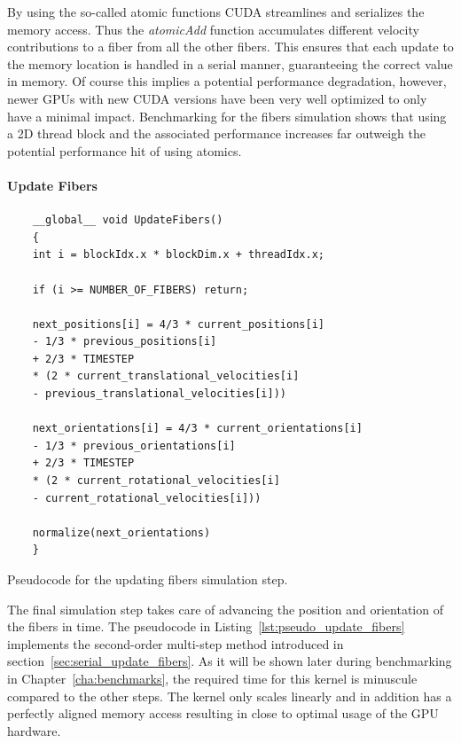 By using the so-called atomic functions CUDA streamlines and serializes the memory access. Thus the \emph{atomicAdd} function accumulates different velocity contributions to a fiber from all the other fibers. This ensures that each update to the memory location is handled in a serial manner, guaranteeing the correct value in memory. Of course this implies a potential performance degradation, however, newer GPUs with new CUDA versions have been very well optimized to only have a minimal impact. Benchmarking for the fibers simulation shows that using a 2D thread block and the associated performance increases far outweigh the potential performance hit of using atomics.

\paragraph{Update Fibers}

\begin{listing}[!htbp]
  \centering
  \begin{verbatim}
    __global__ void UpdateFibers()
    {
    int i = blockIdx.x * blockDim.x + threadIdx.x;

    if (i >= NUMBER_OF_FIBERS) return;

    next_positions[i] = 4/3 * current_positions[i]
    - 1/3 * previous_positions[i]
    + 2/3 * TIMESTEP
    * (2 * current_translational_velocities[i]
    - previous_translational_velocities[i]))

    next_orientations[i] = 4/3 * current_orientations[i]
    - 1/3 * previous_orientations[i]
    + 2/3 * TIMESTEP
    * (2 * current_rotational_velocities[i]
    - current_rotational_velocities[i]))

    normalize(next_orientations)
    }
  \end{verbatim}
  \caption{Pseudocode for the updating fibers simulation step.}
  \label{lst:pseudo_update_fibers}
\end{listing}

The final simulation step takes care of advancing the position and orientation of the fibers in time. The pseudocode in Listing~\ref{lst:pseudo_update_fibers} implements the second-order multi-step method introduced in section~\ref{sec:serial_update_fibers}. As it will be shown later during benchmarking in Chapter~\ref{cha:benchmarks}, the required time for this kernel is minuscule compared to the other steps. The kernel only scales linearly and in addition has a perfectly aligned memory access resulting in close to optimal usage of the GPU hardware.

